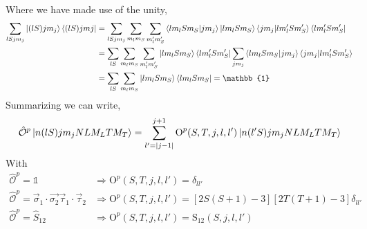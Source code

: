 \documentclass[10pt]{article}
\begin{document}
Where we have made use of the unity,
\begin{align*}
\sum_{l S j m_j} \ket{ (l S) j m_j} \bra{ (l S) j mj} &= \sum_{l S j m_j} \sum_{ m_l m_S} \sum_{m_l' m_S'} \braket{ l m_l S m_S | j m_j } \ket{ l m_l S m_S} \braket{ j m_j | l m_l' S m_S'} \bra{ l m_l' S m_S'} \\
&= \sum_{l S} \sum_{ m_l m_S} \sum_{m_l' m_S'}  \ket{ l m_l S m_S}  \bra{ l m_l' S m_S'} \sum_{j m_j} \braket{ l m_l S m_S | j m_j } \braket{ j m_j | l m_l' S m_S'} \\
&=  \sum_{l S} \sum_{ m_l m_S} \ket{ l m_l S m_S}  \bra{ l m_l S m_S} = \mathbb{1}
\end{align*}
Summarizing we can write,
\begin{align*}
	\hat{\mathcal{O}}^{p} \ket{ n (lS) j m_j N L M_L T M_T } = \sum_{l' = |j-1|}^{j+1} \text{O}^{p}(S,T,j,l,l') \ket{ n (l'S) j m_j N L M_L T M_T }
\end{align*}
With
\begin{align*}
	\hat{\mathcal{O}}^{p} = \mathbb{1} & \Rightarrow  \text{O}^{p}(S,T,j,l,l') = \delta_{l l'} \\
	\hat{\mathcal{O}}^{p} = \vec{\sigma}_{1} \cdot \vec{\sigma_{2}} \vec{ \tau}_{1} \cdot \vec{ \tau}_{2} & \Rightarrow  \text{O}^{p}(S,T,j,l,l') = [ 2S(S+1) - 3 ] [ 2T(T+1) - 3] \delta_{l l'}\\
	\hat{\mathcal{O}}^{p} =  \hat{S}_{12} &\Rightarrow \text{O}^{p}(S,T,j,l,l') = \text{S}_{12}(S,j,l,l')
\end{align*}
\end{document}
